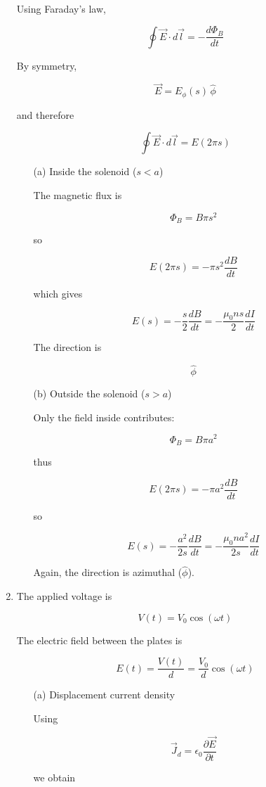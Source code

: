 \documentclass[12pt]{article}
\begin{document}
\begin{enumerate}
Using Faraday’s law,

\[
\oint \vec E\cdot d\vec l
=
-
\frac{d\Phi_B}{dt}
\]

By symmetry,

\[
\vec E = E_\phi(s)\,\hat\phi
\]

and therefore

\[
\oint \vec E\cdot d\vec l
=
E(2\pi s)
\]

\begin{itemize}
\item[(a)] Inside the solenoid (\(s<a\))

The magnetic flux is

\[
\Phi_B
=
B\pi s^2
\]

so

\[
E(2\pi s)
=
-
\pi s^2
\frac{dB}{dt}
\]

which gives

\[
\boxed{
E(s)
=
-\frac{s}{2}
\frac{dB}{dt}
=
-\frac{\mu_0 n s}{2}
\frac{dI}{dt}
}
\]

The direction is

\[
\boxed{\hat\phi}
\]

\item[(b)] Outside the solenoid (\(s>a\))

Only the field inside contributes:

\[
\Phi_B
=
B\pi a^2
\]

thus

\[
E(2\pi s)
=
-
\pi a^2
\frac{dB}{dt}
\]

so

\[
\boxed{
E(s)
=
-
\frac{a^2}{2s}
\frac{dB}{dt}
=
-
\frac{\mu_0 n a^2}{2s}
\frac{dI}{dt}
}
\]

Again, the direction is azimuthal (\(\hat\phi\)).
\end{itemize}

\item The applied voltage is

\[
V(t)=V_0\cos(\omega t)
\]

The electric field between the plates is

\[
E(t)=\frac{V(t)}{d}
=
\frac{V_0}{d}\cos(\omega t)
\]

\begin{itemize}
\item[(a)] Displacement current density

Using

\[
\vec J_d
=
\epsilon_0
\frac{\partial \vec E}{\partial t}
\]

we obtain


\end{itemize}
\end{enumerate}
\end{document}
